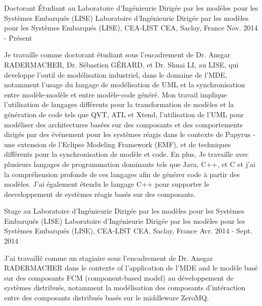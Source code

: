 
\begin{cventries}

\cventry
{Doctorant Étudiant au Laboratoire d'Ingénieurie Dirigée par les modèles pour les Systèmes Embarqués (LISE)} %
{Laboratoire d'Ingénieurie Dirigée par les modèles pour les Systèmes Embarqués (LISE), CEA-LIST} %
{CEA, Saclay, France} %
{Nov. 2014 - Présent} %
{ %
	\begin{cvitems}
		\item {Je travaille comme doctorant étudiant sous l'encadrement de Dr. Ansgar RADERMACHER, Dr. S\'ebastien G\'ERARD, et Dr. Shuai LI, au LISE, qui developpe l'outil de modélisation industriel, dans le domaine de l'MDE, notamment l'usage du langage de modélisation de UML et la synchronisation entre modèle-modèle et entre modèle-code généré. Mon travail implique l'utilisation de langages différents pour la transformation de modèles et la génération de code tels que QVT, ATL et Xtend, l'utilisation de l'UML pour modéliser des architectures basées sur des composants et des comportements dirigés par des événement pour les systèmes réagis dans le contexte de Papyrus - une extension de l'Eclipse Modeling Framework (EMF), et de techniques différents pour la synchronisation de modèle et code. En plus, Je travaille avec plusieurs langages de programmation dominants tels que Java, C++, et C et j'ai la compréhension profonde de ces langages afin de générer code à partir des modèles. J'ai également étendu le langage C++ pour supporter le desveloppement de systèmes réagis basés sur des composants.}		
	\end{cvitems}
}


\cventry
{Stage au Laboratoire d'Ingénieurie Dirigée par les modèles pour les Systèmes Embarqués (LISE)} %
{Laboratoire d'Ingénieurie Dirigée par les modèles pour les Systèmes Embarqués (LISE), CEA-LIST} %
{CEA, Saclay, France} %
{Avr. 2014 - Sept. 2014} %
{ %
	\begin{cvitems}
		\item {J'ai travaillé comme un stagiaire sous l'encadrement de Dr. Ansgar RADERMACHER dans le contexte of l'application de l'MDE and le modèle basé sur des composants FCM (component-based model) au développement de systèmes distribués, notamment la modélisation des composants d'intéraction entre des composants distribués basés sur le middleware ZeroMQ.}		
	\end{cvitems}
}



\end{cventries}
